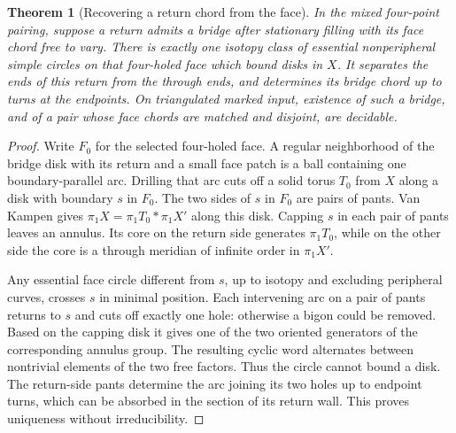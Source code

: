 \documentclass[11pt,letterpaper]{article}
\numberwithin{equation}{section}
\newtheorem{theorem}{Theorem}[section]
\theoremstyle{remark}
\begin{document}
\begin{theorem}[Recovering a return chord from the face]
\label{thm:four-face}
In the mixed four-point pairing, suppose a return admits a bridge
after stationary filling with its face chord free to vary. There
is exactly one isotopy class of essential nonperipheral simple
circles on that four-holed face which bound disks in \(X\).
It separates the ends of this return from the through ends, and
determines its bridge chord up to turns at the endpoints. On
triangulated marked input, existence of such a bridge, and of a
pair whose face chords are matched and disjoint, are decidable.
\end{theorem}
\begin{proof}
Write \(F_0\) for the selected four-holed face. A regular neighborhood
of the bridge disk with its return and a small face patch is a ball
containing one boundary-parallel arc. Drilling that arc cuts off a
solid torus \(T_0\) from \(X\) along a disk with boundary \(s\) in
\(F_0\). The two sides of \(s\) in \(F_0\) are pairs of pants. Van
Kampen gives \(\pi_1X=\pi_1T_0*\pi_1X'\) along this disk. Capping
\(s\) in each pair of pants leaves an annulus. Its core on the return
side generates \(\pi_1T_0\), while on the other side the core is a
through meridian of infinite order in \(\pi_1X'\).

Any essential face circle different from \(s\), up to isotopy and
excluding peripheral curves, crosses \(s\) in minimal position.
Each intervening arc on a pair of pants returns to \(s\) and cuts
off exactly one hole: otherwise a bigon could be removed. Based on
the capping disk it gives one of the two oriented generators of the
corresponding annulus group. The resulting cyclic word alternates
between nontrivial elements of the two free factors. Thus the
circle cannot bound a disk. The return-side pants determine the arc
joining its two holes up to endpoint turns, which can be absorbed
in the section of its return wall. This proves uniqueness without
irreducibility.


\end{proof}
\end{document}
